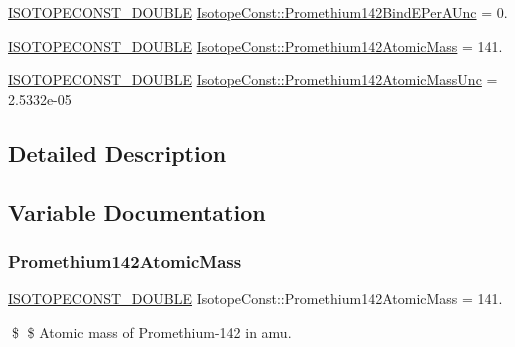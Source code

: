 \begin{DoxyCompactItemize}
\item 
\mbox{\hyperlink{group___isotope_const-_macros_ga8f45a7272ce02c0b4c65c44636ed719a}{I\+S\+O\+T\+O\+P\+E\+C\+O\+N\+S\+T\+\_\+\+D\+O\+U\+B\+LE}} \mbox{\hyperlink{group___isotope_const-_promethium-_pm142_ga80ff18284cca6d145c43bd2b659342a3}{Isotope\+Const\+::\+Promethium142\+Bind\+E\+Per\+A\+Unc}} = 0.
\item 
\mbox{\hyperlink{group___isotope_const-_macros_ga8f45a7272ce02c0b4c65c44636ed719a}{I\+S\+O\+T\+O\+P\+E\+C\+O\+N\+S\+T\+\_\+\+D\+O\+U\+B\+LE}} \mbox{\hyperlink{group___isotope_const-_promethium-_pm142_ga85ae6a5e1bac64548c207609d12c61ad}{Isotope\+Const\+::\+Promethium142\+Atomic\+Mass}} = 141.
\item 
\mbox{\hyperlink{group___isotope_const-_macros_ga8f45a7272ce02c0b4c65c44636ed719a}{I\+S\+O\+T\+O\+P\+E\+C\+O\+N\+S\+T\+\_\+\+D\+O\+U\+B\+LE}} \mbox{\hyperlink{group___isotope_const-_promethium-_pm142_ga68e83511388abdc7c736a726d268d6cd}{Isotope\+Const\+::\+Promethium142\+Atomic\+Mass\+Unc}} = 2.\+5332e-\/05
\end{DoxyCompactItemize}


\subsection{Detailed Description}


\subsection{Variable Documentation}
\mbox{\label{group___isotope_const-_promethium-_pm142_ga85ae6a5e1bac64548c207609d12c61ad}} 
\subsubsection{\texorpdfstring{Promethium142\+Atomic\+Mass}{Promethium142AtomicMass}}
{\footnotesize\ttfamily \mbox{\hyperlink{group___isotope_const-_macros_ga8f45a7272ce02c0b4c65c44636ed719a}{I\+S\+O\+T\+O\+P\+E\+C\+O\+N\+S\+T\+\_\+\+D\+O\+U\+B\+LE}} Isotope\+Const\+::\+Promethium142\+Atomic\+Mass = 141.}

\$ \$ Atomic mass of Promethium-\/142 in amu. \mbox{\label{group___isotope_const-_promethium-_pm142_ga68e83511388abdc7c736a726d268d6cd}} 
